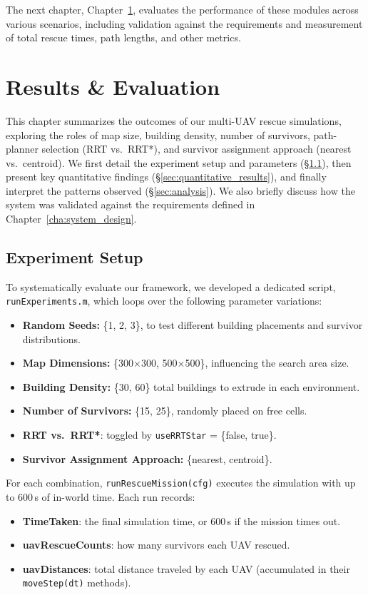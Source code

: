 \documentclass[12pt,a4paper]{report}
\begin{document}
The next chapter, Chapter~\ref{ch:results}, evaluates the performance of these modules 
across various scenarios, including validation against the requirements and 
measurement of total rescue times, path lengths, and other metrics.

\chapter{Results \& Evaluation}
\label{ch:results}

This chapter summarizes the outcomes of our multi-UAV rescue simulations, exploring
the roles of map size, building density, number of survivors, path-planner selection
(RRT vs.\ RRT*), and survivor assignment approach (nearest vs.\ centroid). We first
detail the experiment setup and parameters (\S\ref{sec:experiment_setup}), then present
key quantitative findings (\S\ref{sec:quantitative_results}), and finally interpret the
patterns observed (\S\ref{sec:analysis}). We also briefly discuss how the system 
was validated against the requirements defined in Chapter~\ref{cha:system_design}.

\section{Experiment Setup}
\label{sec:experiment_setup}

To systematically evaluate our framework, we developed a dedicated script,
\texttt{runExperiments.m}, which loops over the following parameter variations:
\begin{itemize}
    \item \textbf{Random Seeds:} \{1, 2, 3\}, to test different building placements
          and survivor distributions.
    \item \textbf{Map Dimensions:} \{300$\times$300, 500$\times$500\}, influencing
          the search area size.
    \item \textbf{Building Density:} \{30, 60\} total buildings to extrude in each environment.
    \item \textbf{Number of Survivors:} \{15, 25\}, randomly placed on free cells.
    \item \textbf{RRT vs.\ RRT*}: toggled by \texttt{useRRTStar} = \{false, true\}.
    \item \textbf{Survivor Assignment Approach:} \{nearest, centroid\}.
\end{itemize}
For each combination, \texttt{runRescueMission(cfg)} executes the simulation with
up to 600\,s of in-world time. Each run records:
\begin{itemize}
    \item \textbf{TimeTaken}: the final simulation time, or 600\,s if the mission times out.
    \item \textbf{uavRescueCounts}: how many survivors each UAV rescued.
    \item \textbf{uavDistances}: total distance traveled by each UAV (accumulated in their
          \texttt{moveStep(dt)} methods).
\end{itemize}
\end{document}
